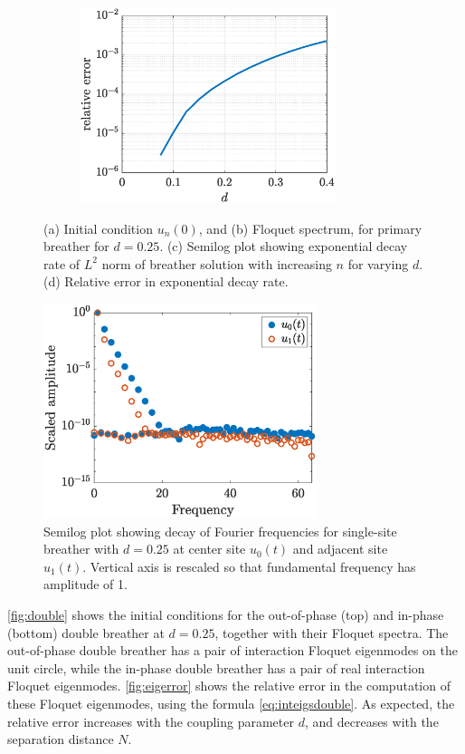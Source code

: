 \documentclass[12pt,reqno]{amsart}
\theoremstyle{definition}
\begin{document}
\begin{figure}
\begin{center}
\begin{subfigure}{0.45\linewidth}
		\caption{}
		\includegraphics[width=7.5cm]{singledecayerror.eps}
		\label{fig:singled}
	\end{subfigure}
	\end{center}
	\caption{(a) Initial condition $u_n(0)$, and (b) Floquet spectrum, for primary breather for $d = 0.25$. (c) Semilog plot showing exponential decay rate of $L^2$ norm of breather solution with increasing $n$ for varying $d$. (d) Relative error in exponential decay rate. }
	\label{fig:single}
\end{figure}

\begin{figure}
	\begin{center}
	\includegraphics[width=8cm]{freqdecay.eps} 
	\end{center}
	\caption{Semilog plot showing decay of Fourier frequencies for single-site breather with $d=0.25$ at center site $u_0(t)$ and adjacent site $u_1(t)$. Vertical axis is rescaled so that fundamental frequency has amplitude of 1.}
	\label{fig:freqdecay}
\end{figure}

\cref{fig:double} shows the initial conditions for the out-of-phase (top) and in-phase (bottom) double breather at $d = 0.25$, together with their Floquet spectra. The out-of-phase double breather has a pair of interaction Floquet eigenmodes on the unit circle, while the in-phase double breather has a pair of real interaction Floquet eigenmodes. \cref{fig:eigerror} shows the relative error in the computation of these Floquet eigenmodes, using the formula \cref{eq:inteigsdouble}. As expected, the relative error increases with the coupling parameter $d$, and decreases with the separation distance $N$. 
\end{document}
